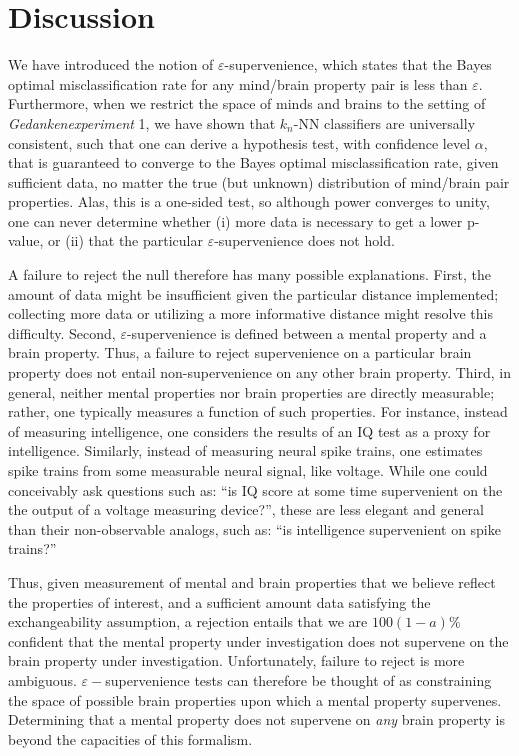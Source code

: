 \documentclass{article}
\newcommand{\eps}{\varepsilon}
\begin{document}
\section*{Discussion}


We have introduced the notion of $\eps$-supervenience, which states that the Bayes optimal misclassification rate for any mind/brain property pair is less than $\eps$.  Furthermore, when we restrict the space of minds and brains to the setting of \emph{Gedankenexperiment}  1, we have shown that $k_n$-NN classifiers are universally consistent, such that one can derive a hypothesis test, with confidence level $\alpha$, that is guaranteed to converge to the Bayes optimal misclassification rate, given sufficient data, no matter the true (but unknown) distribution of mind/brain pair properties.  Alas, this is a one-sided test, so although power converges to unity, one can never determine whether (i) more data is necessary to get a lower p-value, or (ii) that the particular $\eps$-supervenience does not hold.  

A failure to reject the null therefore has many possible explanations.  First, the amount of data might be insufficient given the particular distance implemented; collecting more data or utilizing a more informative distance might resolve this difficulty.  Second, $\eps$-supervenience is defined between a mental property and a brain property.  Thus, a failure to reject supervenience on a particular brain property does not entail non-supervenience on any other brain property.  Third, in general, neither mental properties nor brain properties are directly measurable; rather, one typically measures a function of such properties.  For instance, instead of measuring intelligence, one considers the results of an IQ test as a proxy for intelligence.  Similarly, instead of measuring neural spike trains, one estimates spike trains from some measurable neural signal, like voltage.  While one could conceivably ask questions such as: ``is IQ score at some time supervenient on the the output of a voltage measuring device?'', these are less elegant and general than their non-observable analogs, such as: ``is intelligence supervenient on spike trains?''

Thus, given measurement of mental and brain properties that we believe reflect the properties of interest, and a sufficient amount data satisfying the exchangeability assumption, a rejection entails that we are $100(1-a)\%$ confident that the mental property under investigation does not supervene on the brain property under investigation.  Unfortunately, failure to reject is more ambiguous. $\eps-$supervenience tests can therefore be thought of as constraining the space of possible brain properties upon which a mental property supervenes.  Determining that a mental property does not supervene on \emph{any} brain property is beyond the capacities of this formalism.
\end{document}
